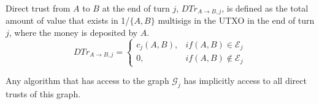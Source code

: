 \documentclass[11pt]{llncs}
\theoremstyle{definition}
\begin{document}
     \begin{definition}
        Direct trust from $A$ to $B$ at the end of turn $j$, $DTr_{A \rightarrow B, j}$, is defined as the total amount of
        value that exists in 1/$\{A,B\}$ multisigs in the UTXO in the end of turn $j$, where the money is deposited by $A$.
        \begin{equation}
           DTr_{A \rightarrow B, j} =
              \begin{cases}
                 c_j\left(A, B\right), & if \left(A, B\right) \in \mathcal{E}_j \\
                 0, & if \left(A, B\right) \notin \mathcal{E}_j
              \end{cases}
        \end{equation}
     \end{definition}
     Any algorithm that has access to the graph $\mathcal{G}_j$ has implicitly access to all direct trusts of this graph.
\end{document}
